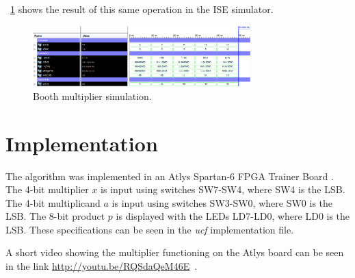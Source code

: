 \documentclass[titlepage]{article}
\begin{document}
\figurename~\ref{fig:booth-multiplier-sim} shows the result of this same operation in the ISE simulator.

\begin{figure}[ht]
    \centering
    \includegraphics[width=0.75\textwidth]{booth-multiplier-sim}
    \caption{Booth multiplier simulation.}
    \label{fig:booth-multiplier-sim}
\end{figure}




\section{Implementation} %
\label{sec:implementation}

The algorithm was implemented in an Atlys Spartan-6 FPGA Trainer Board \cite{AtlysWeb}.
The 4-bit multiplier $x$ is input using switches SW7-SW4, where SW4 is the LSB.
The 4-bit multiplicand $a$ is input using switches SW3-SW0, where SW0 is the LSB.
The 8-bit product $p$ is displayed with the LEDs LD7-LD0, where LD0 is the LSB.
These specifications can be seen in the \emph{ucf} implementation file.\par

A short video showing the multiplier functioning on the Atlys board can be seen in the link \url{http://youtu.be/RQSdaQeM46E}~\cite{Gallegos2014Multiplicador}.






\end{document}
